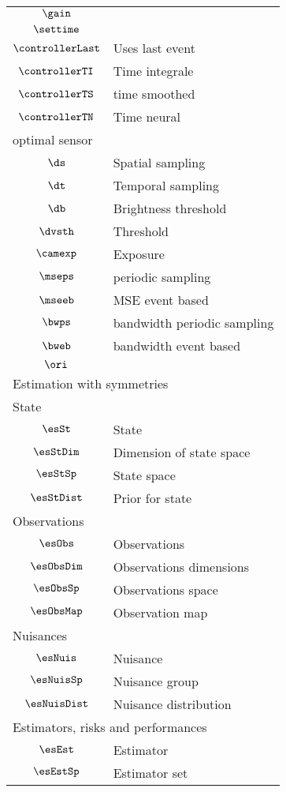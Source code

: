 \begin{longtable}{cl}
 $\gain$ & \\ 
 $\settime$ & \\ 
 $\controllerLast$ &  Uses last event\\ 
 $\controllerTI$ &  Time integrale\\ 
 $\controllerTS$ &  time smoothed\\ 
 $\controllerTN$ &  Time neural\\ 
 \multicolumn{2}{l}{optimal sensor}\\ 
 \hline
$\ds$ &  Spatial sampling\\ 
 $\dt$ &  Temporal sampling\\ 
 $\db$ &  Brightness threshold\\ 
 $\dvsth$ &  Threshold\\ 
 $\camexp$ &  Exposure\\ 
 $\mseps$ &  periodic sampling\\ 
 $\mseeb$ &  MSE event based\\ 
 $\bwps$ &  bandwidth periodic sampling\\ 
 $\bweb$ &  bandwidth event based\\ 
 $\ori$ & \\ 
 \multicolumn{2}{l}{Estimation with symmetries}\\ 
 \hline
\multicolumn{2}{l}{State}\\ 
 \hline
$\esSt$ &  State\\ 
 $\esStDim$ &  Dimension of state space\\ 
 $\esStSp$ &  State space\\ 
 $\esStDist$ &  Prior for state\\ 
 \multicolumn{2}{l}{Observations}\\ 
 \hline
$\esObs$ &  Observations\\ 
 $\esObsDim$ &  Observations dimensions\\ 
 $\esObsSp$ &  Observations space\\ 
 $\esObsMap$ &  Observation map\\ 
 \multicolumn{2}{l}{Nuisances}\\ 
 \hline
$\esNuis$ &  Nuisance\\ 
 $\esNuisSp$ &  Nuisance group\\ 
 $\esNuisDist$ &  Nuisance distribution\\ 
 \multicolumn{2}{l}{Estimators, risks and performances}\\ 
 \hline
$\esEst$ &  Estimator\\ 
 $\esEstSp$ &  Estimator set\\ 

\end{longtable}
